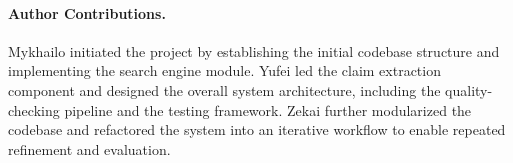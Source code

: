 \paragraph{Author Contributions.}
Mykhailo initiated the project by establishing the initial codebase structure and implementing the search engine module.
Yufei led the claim extraction component and designed the overall system architecture, including the quality-checking pipeline and the testing framework.
Zekai further modularized the codebase and refactored the system into an iterative workflow to enable repeated refinement and evaluation.